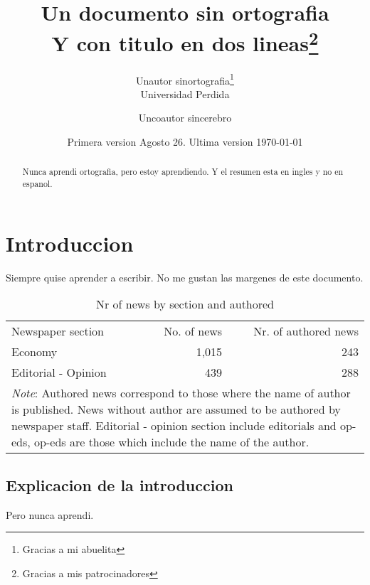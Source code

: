 \documentclass{article}
\begin{document}

\title{Un documento sin ortografia \\ Y con titulo en dos lineas\thanks{Gracias a mis patrocinadores}}
\author{Unautor sinortografia\thanks{Gracias a mi abuelita}\\ Universidad Perdida \and Uncoautor sincerebro}
\date{Primera version Agosto 26. Ultima version \today}

\maketitle

\begin{abstract}
    Nunca aprendi ortografia, pero estoy aprendiendo. Y el resumen esta en ingles y no en espanol.
\end{abstract}

\newpage
    \tableofcontents
    \listoffigures
    \listoftables

\newpage
\section{Introduccion}\label{sec.intro}
    Siempre quise aprender a escribir. No me gustan las margenes de este documento.

    \begin{table}[t]
        \centering
        \caption[Nr of news by section and authored]{Nr of news by section and authored}
        \begin{tabular}{lrr}
        \hline
        Newspaper section & No. of news & Nr. of authored news \\
        Economy & 1,015 & 243 \\
        Editorial - Opinion & 439 & 288 \\
        \hline
        \multicolumn{3}{p{0.70\textwidth}}{\footnotesize{\emph{Note}: Authored news correspond to those where the name of author is published. News without author are assumed to be authored by newspaper staff. Editorial - opinion section include editorials and op-eds, op-eds are those which include the name of the author.}}\\
        \end{tabular}
        \label{tab:news.description}
    \end{table}

\subsection{Explicacion de la introduccion}\label{ssec.intro.explicacion}
    Pero nunca aprendi.
\end{document}
